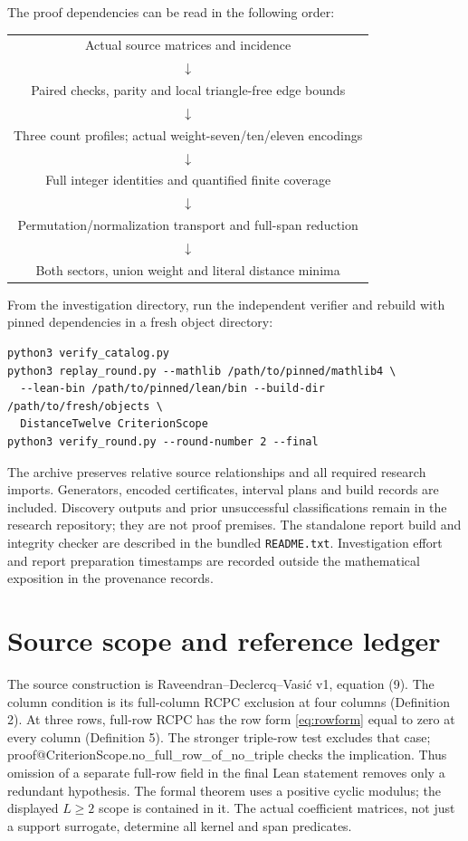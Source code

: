 \documentclass[11pt]{article}
\makeatletter
\theoremstyle{definition}\newtheorem{definition}[theorem]{Definition}
\newcommand{\lean}[2]{\csname proof@#1.#2\endcsname}
\makeatother
\begin{document}
The proof dependencies can be read in the following order:
\begin{center}
\begin{tabular}{c}
Actual source matrices and incidence\\$\downarrow$\\
Paired checks, parity and local triangle-free edge bounds\\$\downarrow$\\
Three count profiles; actual weight-seven/ten/eleven encodings\\$\downarrow$\\
Full integer identities and quantified finite coverage\\$\downarrow$\\
Permutation/normalization transport and full-span reduction\\$\downarrow$\\
Both sectors, union weight and literal distance minima
\end{tabular}
\end{center}

From the investigation directory, run the independent verifier and rebuild
with pinned dependencies in a fresh object directory:
\begin{lstlisting}
python3 verify_catalog.py
python3 replay_round.py --mathlib /path/to/pinned/mathlib4 \
  --lean-bin /path/to/pinned/lean/bin --build-dir /path/to/fresh/objects \
  DistanceTwelve CriterionScope
python3 verify_round.py --round-number 2 --final
\end{lstlisting}
The archive preserves relative source relationships and all required research
imports. Generators, encoded certificates, interval plans and build records
are included. Discovery outputs and prior unsuccessful classifications remain
in the research repository; they are not proof premises. The standalone
report build and integrity checker are described in the bundled
\texttt{README.txt}. Investigation effort and report preparation timestamps
are recorded outside the mathematical exposition in the provenance records.

\clearpage\section{Source scope and reference ledger}\label{app:scope}
The source construction is Raveendran--Declercq--Vasi\'c v1,
equation (9). The column condition is its full-column RCPC exclusion at
four columns (Definition 2). At three rows, full-row RCPC has the row form
\eqref{eq:rowform} equal to zero at every column (Definition 5).
The stronger triple-row test excludes that case;
\lean{CriterionScope}{no_full_row_of_no_triple} checks the implication.
Thus omission of a separate full-row field in the final Lean statement
removes only a redundant hypothesis. The formal theorem uses a positive
cyclic modulus; the displayed $L\geq2$ scope is contained in it.
The actual coefficient matrices, not just a support surrogate, determine all
kernel and span predicates.
\end{document}
